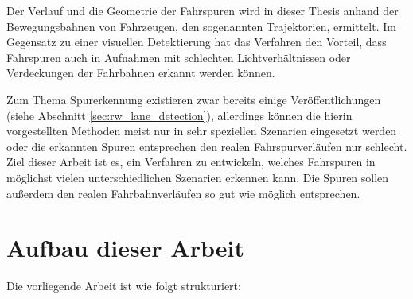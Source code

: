 Der Verlauf und die Geometrie der Fahrspuren wird in dieser Thesis anhand der Bewegungsbahnen von Fahrzeugen, den sogenannten Trajektorien,
ermittelt. Im Gegensatz zu einer visuellen Detektierung hat das Verfahren den Vorteil, dass Fahrspuren auch in Aufnahmen
mit schlechten Lichtverhältnissen oder Verdeckungen der Fahrbahnen erkannt werden können.

Zum Thema Spurerkennung existieren zwar bereits einige Veröffentlichungen (siehe Abschnitt \ref{sec:rw_lane_detection}),
allerdings können die hierin
vorgestellten Methoden meist nur in sehr speziellen Szenarien eingesetzt werden oder die erkannten Spuren
entsprechen den realen Fahrspurverläufen nur schlecht. Ziel dieser Arbeit ist es, ein Verfahren zu entwickeln,
welches Fahrspuren in möglichst vielen unterschiedlichen Szenarien erkennen kann.
Die Spuren sollen außerdem den realen Fahrbahnverläufen so gut wie möglich entsprechen.

\section{Aufbau dieser Arbeit}
\label{sec:aufbau}

Die vorliegende Arbeit ist wie folgt strukturiert:

